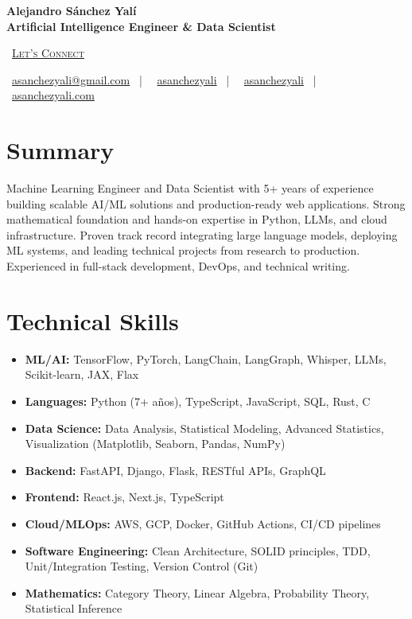 \documentclass[letterpaper,11pt]{article}
\newcommand{\normalfaCalendar}{{\mdseries\faCalendar}}
\newcommand{\normalfaEnvelope}{{\mdseries\faEnvelope}}
\newcommand{\normalfaLinkedin}{{\mdseries\faLinkedin}}
\newcommand{\normalfaGithub}{{\mdseries\faGithub}}
\newcommand{\normalfaGlobe}{{\mdseries\faGlobe}}
\begin{document}
\begin{center}
\textbf{\Huge Alejandro Sánchez Yalí}\\[0.3em]
\textbf{\Large Artificial Intelligence Engineer \& Data Scientist}\\[0.5em]
\small

\normalfaCalendar\ \href{https://cal.com/asanchezyali/full-time-opportunities}{\textsc{Let's Connect}}

\vspace{1em}

\normalfaEnvelope\ \href{mailto:asanchezyali@gmail.com}{asanchezyali@gmail.com}  ~|~
\normalfaLinkedin\ \href{https://www.linkedin.com/in/asanchezyali}{asanchezyali} ~|~
\normalfaGithub\ \href{https://github.com/asanchezyali}{asanchezyali}  ~|~
\normalfaGlobe\ \href{https://asanchezyali.com}{asanchezyali.com} 

\end{center}

\section{Summary}
Machine Learning Engineer and Data Scientist with 5+ years of experience building scalable AI/ML solutions and production-ready web applications. Strong mathematical foundation and hands-on expertise in Python, LLMs, and cloud infrastructure. Proven track record integrating large language models, deploying ML systems, and leading technical projects from research to production. Experienced in full-stack development, DevOps, and technical writing.

\section{Technical Skills}
\begin{itemize}[leftmargin=*]
  \item \textbf{ML/AI:} TensorFlow, PyTorch, LangChain, LangGraph, Whisper, LLMs, Scikit-learn, JAX, Flax
  \item \textbf{Languages:} Python (7+ años), TypeScript, JavaScript, SQL, Rust, C
  \item \textbf{Data Science:} Data Analysis, Statistical Modeling, Advanced Statistics, Visualization (Matplotlib, Seaborn, Pandas, NumPy)
  \item \textbf{Backend:} FastAPI, Django, Flask, RESTful APIs, GraphQL
  \item \textbf{Frontend:} React.js, Next.js, TypeScript
  \item \textbf{Cloud/MLOps:} AWS, GCP, Docker, GitHub Actions, CI/CD pipelines
  \item \textbf{Software Engineering:} Clean Architecture, SOLID principles, TDD, Unit/Integration Testing, Version Control (Git)
  \item \textbf{Mathematics:} Category Theory, Linear Algebra, Probability Theory, Statistical Inference
\end{itemize}
\end{document}
